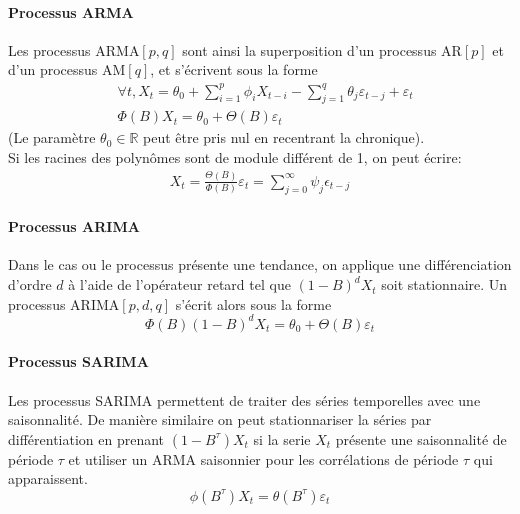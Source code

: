 \documentclass{article}
\theoremstyle{definition}
\theoremstyle{remark}
\begin{document}
\paragraph{Processus ARMA \\}
Les processus ARMA$[p,q]$ sont ainsi la superposition d'un processus AR$[p]$ et d'un processus AM$[q]$, et s'écrivent sous la forme
\begin{equation}
	\begin{aligned}
	&\forall t, X_{t}=\theta_{0}+\sum_{i=1}^{p} \phi_{i} X_{t-i}-\sum_{j=1}^{q} \theta_{j} \varepsilon_{t-j}+\varepsilon_{t} \\
	&\Phi(B) X_{t}=\theta_{0}+\Theta(B) \varepsilon_{t} 
	\end{aligned}
\end{equation}
(Le paramètre $\theta_0 \in \mathbb{R}$ peut être pris nul en recentrant la chronique). \\
Si les racines des polynômes sont de module différent de 1, on peut écrire:
\begin{equation}
	\begin{aligned}
	 X_{t}= \frac{\Theta(B)}{\Phi(B)} \varepsilon_{t} = \sum_{j=0}^{\infty}{\psi_j \epsilon_{t-j}}
		\end{aligned}
\end{equation}

\paragraph{Processus ARIMA\\}
Dans le cas ou le processus présente une tendance, on applique une différenciation d'ordre $d$ à l'aide de l'opérateur retard
tel que $(1-B)^d X_t$ soit stationnaire.
Un processus ARIMA$[p,d,q]$ s'écrit alors sous la forme
\begin{equation}
	\Phi(B)(1-B)^{d} X_{t}=\theta_{0}+\Theta(B) \varepsilon_{t}
	\end{equation}

\paragraph{Processus SARIMA\\}
Les processus SARIMA permettent de traiter des séries temporelles avec une saisonnalité.
De manière similaire on peut stationnariser la séries par différentiation en prenant $(1-B^{\tau})X_t$
 si la serie $X_t$ présente une saisonnalité de période $\tau$ et utiliser un ARMA saisonnier pour les corrélations de 
 période $\tau$ qui apparaissent.
 \begin{equation}
	\phi\left(B^{\tau}\right) X_{t}=\theta\left(B^{\tau}\right) \varepsilon_{t}
	\end{equation}
\end{document}
